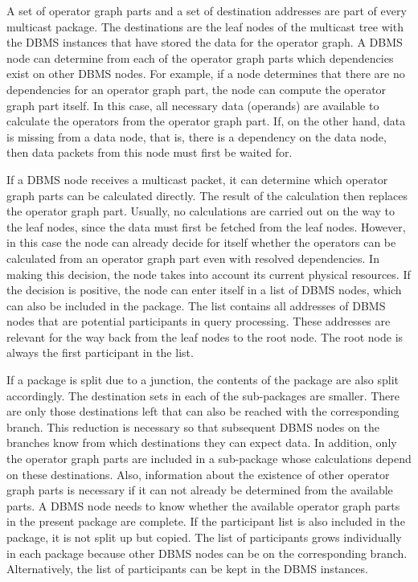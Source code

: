 \documentclass[english,version-2019-11]{uzl-thesis}
\begin{document}
A set of operator graph parts and a set of destination addresses are part of every multicast package. The destinations are the leaf nodes of the multicast tree with the DBMS instances that have stored the data for the operator graph. A DBMS node can determine from each of the operator graph parts which dependencies exist on other DBMS nodes. For example, if a node determines that there are no dependencies for an operator graph part, the node can compute the operator graph part itself. In this case, all necessary data (operands) are available to calculate the operators from the operator graph part. If, on the other hand, data is missing from a data node, that is, there is a dependency on the data node, then data packets from this node must first be waited for.

If a DBMS node receives a multicast packet, it can determine which operator graph parts can be calculated directly. The result of the calculation then replaces the operator graph part. Usually, no calculations are carried out on the way to the leaf nodes, since the data must first be fetched from the leaf nodes. However, in this case the node can already decide for itself whether the operators can be calculated from an operator graph part even with resolved dependencies. In making this decision, the node takes into account its current physical resources. If the decision is positive, the node can enter itself in a list of DBMS nodes, which can also be included in the package. The list contains all addresses of DBMS nodes that are potential participants in query processing. These addresses are relevant for the way back from the leaf nodes to the root node. The root node is always the first participant in the list.

If a package is split due to a junction, the contents of the package are also split accordingly. The destination sets in each of the sub-packages are smaller. There are only those destinations left that can also be reached with the corresponding branch. This reduction is necessary so that subsequent DBMS nodes on the branches know from which destinations they can expect data. In addition, only the operator graph parts are included in a sub-package whose calculations depend on these destinations. Also, information about the existence of other operator graph parts is necessary if it can not already be determined from the available parts. A DBMS node needs to know whether the available operator graph parts in the present package are complete. If the participant list is also included in the package, it is not split up but copied. The list of participants grows individually in each package because other DBMS nodes can be on the corresponding branch. Alternatively, the list of participants can be kept in the DBMS instances.
\end{document}
